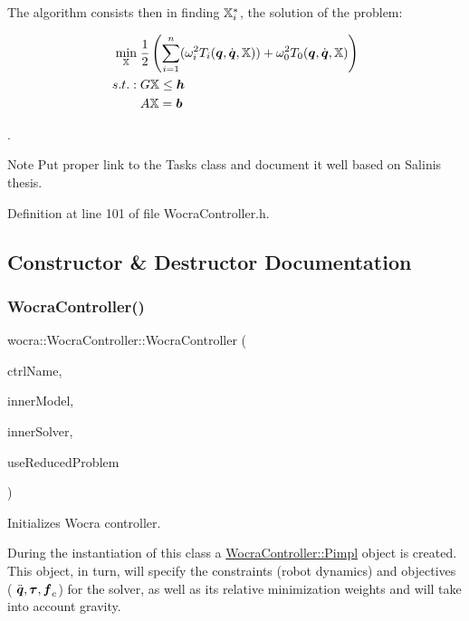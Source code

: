 The algorithm consists then in finding $\mathbb{X}_i^*$, the solution of the problem\+:

\begin{align*} \underset{\mathbb{X}}{\text{min}} &\; \frac{1}{2} \left( \sum_{i=1}^{n} (\omega_i^2 T_i (\mbox{\boldmath${q}$}, \dot{\mbox{\boldmath${q}$}}, \mathbb{X})) + \omega_0^2 T_0(\mbox{\boldmath${q}$}, \dot{\mbox{\boldmath${q}$}}, \mathbb{X}) \right) \\ s.t.: &\; G \mathbb{X} \leq \mbox{\boldmath${h}$} \\ &\; A \mathbb{X} = \mbox{\boldmath${b}$} \end{align*}

\cite{salini2012Thesis}.

\begin{DoxyNote}{Note}
Put proper link to the Tasks class and document it well based on Salini\textquotesingle{}s thesis. 
\end{DoxyNote}


Definition at line 101 of file Wocra\+Controller.\+h.



\subsection{Constructor \& Destructor Documentation}
\hypertarget{classwocra_1_1WocraController_ae14fda387f6d308aead6ab7a59e82e74}{}\label{classwocra_1_1WocraController_ae14fda387f6d308aead6ab7a59e82e74} 
\subsubsection{\texorpdfstring{Wocra\+Controller()}{WocraController()}}
{\footnotesize\ttfamily wocra\+::\+Wocra\+Controller\+::\+Wocra\+Controller (\begin{DoxyParamCaption}\item[{const std\+::string \&}]{ctrl\+Name,  }\item[{std\+::shared\+\_\+ptr$<$ Model $>$}]{inner\+Model,  }\item[{std\+::shared\+\_\+ptr$<$ \hyperlink{classocra_1_1OneLevelSolver}{One\+Level\+Solver} $>$}]{inner\+Solver,  }\item[{bool}]{use\+Reduced\+Problem }\end{DoxyParamCaption})}

Initializes Wocra controller.

During the instantiation of this class a \hyperlink{structwocra_1_1WocraController_1_1Pimpl}{Wocra\+Controller\+::\+Pimpl} object is created. This object, in turn, will specify the constraints (robot dynamics) and objectives ( $ \ddot{\mbox{\boldmath${q}$}}, \mbox{\boldmath${\tau}$}, \mbox{\boldmath${f}$}_c $) for the solver, as well as its relative minimization weights and will take into account gravity.


